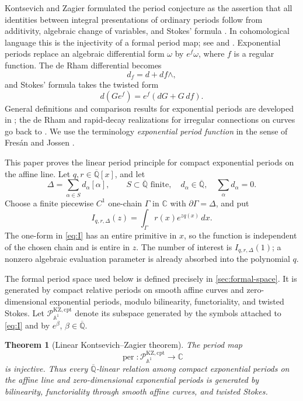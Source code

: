 \documentclass[11pt]{article}
\numberwithin{equation}{section}
\newtheorem{theorem}{Theorem}[section]
\theoremstyle{definition}
\theoremstyle{remark}
\newcommand{\C}{\mathbb C}
\newcommand{\Qbar}{\overline{\mathbb Q}}
\newcommand{\Aone}{\mathbb A^1}
\newcommand{\per}{\operatorname{per}}
\newcommand{\Pcal}{\mathcal P}
\begin{document}
Kontsevich and Zagier formulated the period conjecture as the assertion that
all identities between integral presentations of ordinary periods follow
from additivity, algebraic change of variables, and Stokes' formula
\cite{KontsevichZagier}.  In cohomological language this is the injectivity
of a formal period map; see
\cite[Chapters~12--13]{HuberMullerStach} and
\cite{CressonViuSos}.  Exponential periods replace an algebraic differential
form $\omega$ by $e^f\omega$, where $f$ is a regular function.  The de Rham
differential becomes
\[
  d_f=d+df\wedge,
\]
and Stokes' formula takes the twisted form
\[
  d(Ge^f)=e^f(dG+G\,df).
\]
General definitions and comparison results for exponential periods are
developed in \cite{CommelinHabeggerHuber}; the de Rham and rapid-decay
realizations for irregular connections on curves go back to
\cite{BlochEsnault,HienFlat}.  We use the terminology \emph{exponential
period function} in the sense of Fres\'an and Jossen
\cite{FresanJossen}.

This paper proves the linear period principle for compact exponential
periods on the affine line.  Let $q,r\in\Qbar[x]$, and let
\[
  \Delta=\sum_{\alpha\in S}d_\alpha[\alpha],
  \qquad S\subset\Qbar\text{ finite},\quad
  d_\alpha\in\Qbar,\quad \sum_\alpha d_\alpha=0.
\]
Choose a finite piecewise $C^1$ one-chain $\Gamma$ in $\C$ with
$\partial\Gamma=\Delta$, and put
\begin{equation}\label{eq:I}
  I_{q,r,\Delta}(z)=\int_\Gamma r(x)e^{zq(x)}\,dx.
\end{equation}
The one-form in \eqref{eq:I} has an entire primitive in $x$, so the function
is independent of the chosen chain and is entire in $z$.  The number of
interest is $I_{q,r,\Delta}(1)$; a nonzero algebraic evaluation parameter is
already absorbed into the polynomial $q$.

The formal period space used below is defined precisely in
\cref{sec:formal-space}.  It is generated by compact relative periods on
smooth affine curves and zero-dimensional exponential periods, modulo bilinearity, functoriality,
and twisted Stokes.  Let
$\Pcal_{\Aone}^{\mathrm{KZ,cpt}}$ denote its subspace generated by the
symbols attached to \eqref{eq:I} and by $e^\beta$, $\beta\in\Qbar$.

\begin{theorem}[Linear Kontsevich--Zagier theorem]\label{thm:main}
The period map
\[
  \per:\Pcal_{\Aone}^{\mathrm{KZ,cpt}}\longrightarrow\C
\]
is injective.  Thus every $\Qbar$-linear relation among compact exponential
periods on the affine line and zero-dimensional exponential periods is generated by bilinearity,
functoriality through smooth affine curves, and twisted Stokes.
\end{theorem}
\end{document}
